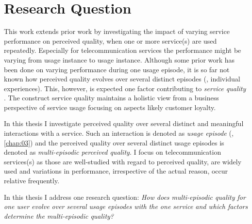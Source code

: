 \section{Research Question}
This work extends prior work by investigating the impact of varying service performance on perceived quality, when one or more service(s) are used repeatedly.
Especially for telecommunication services the performance might be varying from usage instance to usage instance.
Although some prior work has been done on varying performance during one usage episode, it is so far not known how perceived quality evolves over several distinct episodes (\ie, individual experiences).
This, however, is expected one factor contributing to \emph{service quality} \citep[\cf,][]{zeithaml_behavioral_1996}.
The construct service quality maintains a holistic view from a business perspective of service usage focusing on aspects likely customer loyalty.

In this thesis I investigate perceived quality over several distinct and meaningful interactions with a service.
Such an interaction is denoted as \emph{usage episode} (\cf, \autoref{chap:03}) and the perceived quality over several distinct usage episodes is denoted as \emph{multi-episodic perceived quality}.
I focus on telecommunication services(s) as those are well-studied with regard to perceived quality, are widely used and variations in performance, irrespective of the actual reason, occur relative frequently.

In this thesis I address one research question: \emph{How does multi-episodic quality for one user evolve over several usage episodes with the one service and which factors determine the multi-episodic quality?}


